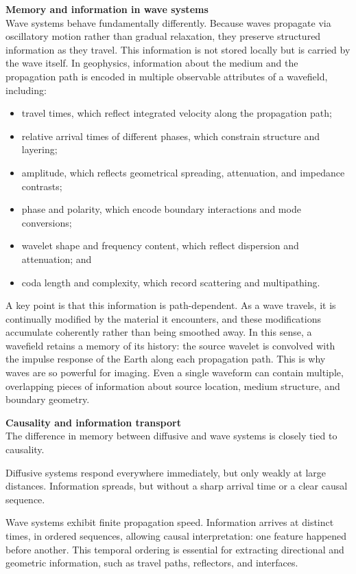 {    \medskip
    \noindent\textbf{Memory and information in wave systems}\\
    Wave systems behave fundamentally differently. Because waves propagate via oscillatory motion rather than gradual relaxation, they preserve structured information as they travel. This information is not stored locally but is carried by the wave itself.  In geophysics, information about the medium and the propagation path is encoded in multiple observable attributes of a wavefield, including:

    \begin{itemize}
        \item travel times, which reflect integrated velocity along the propagation path;
        \item relative arrival times of different phases, which constrain structure and layering;
        \item amplitude, which reflects geometrical spreading, attenuation, and impedance contrasts;
        \item phase and polarity, which encode boundary interactions and mode conversions;
        \item wavelet shape and frequency content, which reflect dispersion and attenuation; and
        \item coda length and complexity, which record scattering and multipathing. 
    \end{itemize}

    A key point is that this information is path-dependent. As a wave travels, it is continually modified by the material it encounters, and these modifications accumulate coherently rather than being smoothed away. In this sense, a wavefield retains a memory of its history: the source wavelet is convolved with the impulse response of the Earth along each propagation path.  This is why waves are so powerful for imaging. Even a single waveform can contain multiple, overlapping pieces of information about source location, medium structure, and boundary geometry.

    \medskip
    \noindent\textbf{Causality and information transport}\\
    The difference in memory between diffusive and wave systems is closely tied to causality.
    
    Diffusive systems respond everywhere immediately, but only weakly at large distances. Information spreads, but without a sharp arrival time or a clear causal sequence.
    
    Wave systems exhibit finite propagation speed. Information arrives at distinct times, in ordered sequences, allowing causal interpretation: one feature happened before another.  This temporal ordering is essential for extracting directional and geometric information, such as travel paths, reflectors, and interfaces.

}
